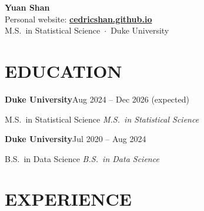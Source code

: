 \documentclass[10pt,letterpaper]{article}
\newcommand{\entry}[4]{%
  \noindent\textbf{\color{ink}#1}\hfill{\color{soft}\small #3}\par%
  \def\tmp{#2}\ifx\tmp\empty\else%
    {\itshape\color{muted}\small #2}\hfill\textit{\color{soft}\small #4}\par%
  \fi%
  \vspace{1pt}%
}
\begin{document}
\linespread{0.95}\selectfont

\begin{center}
  {\fontsize{24}{28}\selectfont\bfseries\color{ink} Yuan Shan}\\[2pt]
  {\small\color{muted} Personal website:}\; {\fontsize{11.5}{13}\selectfont\bfseries\color{accent}\href{https://cedricshan.github.io}{cedricshan.github.io}}\\[3pt]
  {\small\color{muted} M.S.\ in Statistical Science\, $\cdot$\, Duke University}
\end{center}

\vspace{2pt}

\section{EDUCATION}

\entry{Duke University}{M.S.\ in Statistical Science}{Aug 2024 -- Dec 2026 (expected)}{}
\entry{Duke University}{B.S.\ in Data Science}{Jul 2020 -- Aug 2024}{}

\section{EXPERIENCE}
\end{document}
